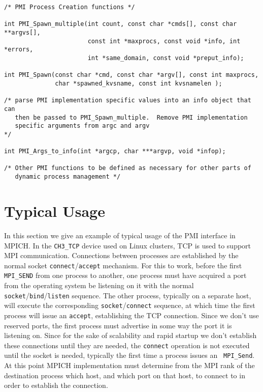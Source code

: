 \documentclass[11pt]{article}
\begin{document}
\begin{small}
\begin{verbatim}
/* PMI Process Creation functions */

int PMI_Spawn_multiple(int count, const char *cmds[], const char **argvs[], 
                       const int *maxprocs, const void *info, int *errors, 
                       int *same_domain, const void *preput_info);

int PMI_Spawn(const char *cmd, const char *argv[], const int maxprocs,
              char *spawned_kvsname, const int kvsnamelen );

/* parse PMI implementation specific values into an info object that can
   then be passed to PMI_Spawn_multiple.  Remove PMI implementation
   specific arguments from argc and argv
*/

int PMI_Args_to_info(int *argcp, char ***argvp, void *infop);

/* Other PMI functions to be defined as necessary for other parts of
   dynamic process management */

\end{verbatim}
\end{small}


\section{Typical Usage}
\label{sec:usage}

In this section we give an example of typical usage of the PMI interface
in MPICH.  In the {\tt CH3\_TCP} device used on Linux clusters, TCP is
used to support MPI communication.  Connections between processes are
established by the normal socket {\tt connect}/{\tt accept} mechanism.
For this to work, before the first {\tt MPI\_SEND} from one process to
another, one process must have acquired a port from the operating system
be listening on it with the normal {\tt socket}/{\tt bind}/{\tt listen}
sequence.  The other process, typically on a separate host, will execute
the corresponding {\tt socket}/{\tt connect} sequence, at which time the
first process will issue an {\tt accept}, establishing the TCP
connection.  Since we don't use reserved ports, the first process must
advertise in some way the port it is listening on.  Since for the sake
of scalability and rapid startup we don't establish these connections
until they are needed, the {\tt connect} operation is not executed until
the socket is needed, typically the first time a process issues an {\tt
  MPI\_Send}.  At this point MPICH implementation must determine from the
MPI rank of the destination process which host, and which port on that
host, to connect to in order to establish the connection.
\end{document}
